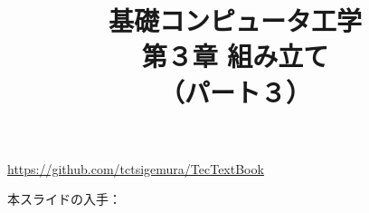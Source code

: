 \documentclass{beamer}                 %
\begin{document}
\title{基礎コンピュータ工学\\第３章 組み立て\\（パート３）}
\date{}

\begin{frame}
  \titlepage
  \centerline{\url{https://github.com/tctsigemura/TecTextBook}}
  \vfill
  \centerline{本スライドの入手：
    }
\end{frame}

\end{document}
